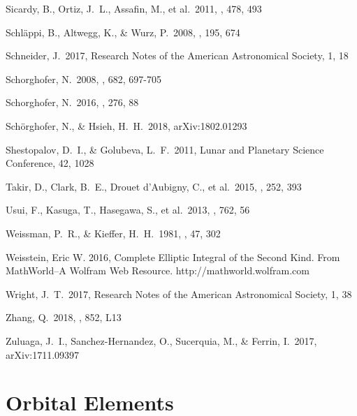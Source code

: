 \documentclass[a4paper,fleqn,usenatbib]{mnras}
\begin{document}
\begin{thebibliography}{99}
 Sicardy, B., Ortiz, J.~L., Assafin, M., et al.\ 2011, \nat, 478, 493 

 Schl{\"a}ppi, B., Altwegg, K., \& Wurz, P.\ 2008, \icarus, 195, 674 

 Schneider, J.\ 2017, Research Notes of the American Astronomical Society, 1, 18

 Schorghofer, N.\ 2008, \apj, 682, 697-705 

 Schorghofer, N.\ 2016, \icarus, 276, 88

 Sch{\"o}rghofer, N., \& Hsieh, H.~H.\ 2018, arXiv:1802.01293

 Shestopalov, D.~I., \& Golubeva, L.~F.\ 2011, Lunar and Planetary Science Conference, 42, 1028

 Takir, D., Clark, B.~E., Drouet d'Aubigny, C., et al.\ 2015, \icarus, 252, 393 

 Usui, F., Kasuga, T., Hasegawa, S., et al.\ 2013, \apj, 762, 56 

 Weissman, P.~R., \& Kieffer, H.~H.\ 1981, \icarus, 47, 302 

 Weisstein, Eric W. 2016, Complete Elliptic Integral of the Second Kind. From MathWorld--A Wolfram Web Resource. http://mathworld.wolfram.com

 Wright, J.~T.\ 2017, Research Notes of the American Astronomical Society, 1, 38 

 Zhang, Q.\ 2018, \apjl, 852, L13

 Zuluaga, J.~I., Sanchez-Hernandez, O., Sucerquia, M., \& Ferrin, I.\ 2017, arXiv:1711.09397

\end{thebibliography}



\appendix
\section{Orbital Elements}
\label{sec:elements}
\end{document}
